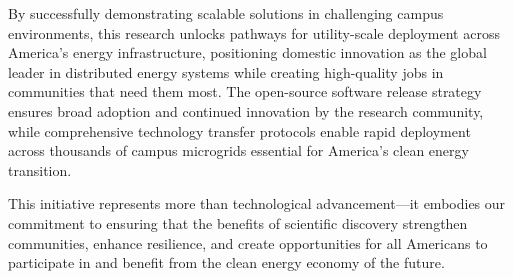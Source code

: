\documentclass[12pt]{article}
\begin{document}
By successfully demonstrating scalable solutions in challenging campus environments, this research unlocks pathways for utility-scale deployment across America's energy infrastructure, positioning domestic innovation as the global leader in distributed energy systems while creating high-quality jobs in communities that need them most. The open-source software release strategy ensures broad adoption and continued innovation by the research community, while comprehensive technology transfer protocols enable rapid deployment across thousands of campus microgrids essential for America's clean energy transition.

This initiative represents more than technological advancement---it embodies our commitment to ensuring that the benefits of scientific discovery strengthen communities, enhance resilience, and create opportunities for all Americans to participate in and benefit from the clean energy economy of the future.



\end{document}
